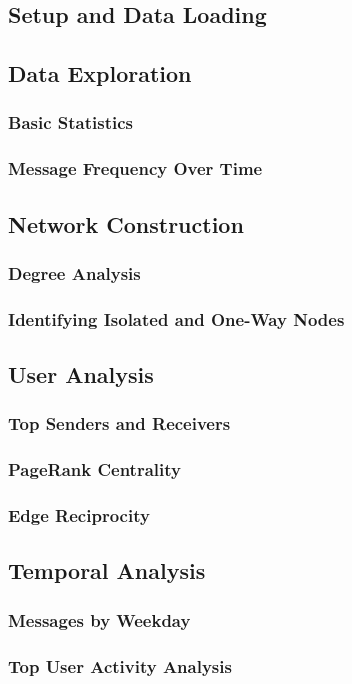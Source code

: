 
\subsection{Setup and Data Loading}


\subsection{Data Exploration}
\subsubsection{Basic Statistics}
\subsubsection{Message Frequency Over Time}

\subsection{Network Construction}
\subsubsection{Degree Analysis}
\subsubsection{Identifying Isolated and One-Way Nodes}

\subsection{User Analysis}
\subsubsection{Top Senders and Receivers}
\subsubsection{PageRank Centrality}
\subsubsection{Edge Reciprocity}

\subsection{Temporal Analysis}
\subsubsection{Messages by Weekday}
\subsubsection{Top User Activity Analysis}

